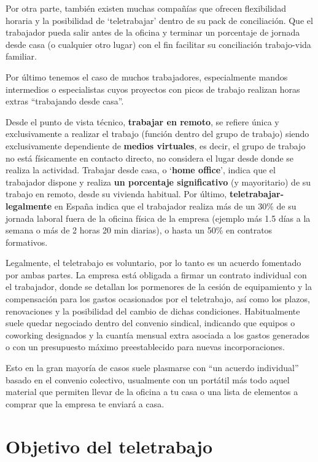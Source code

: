 Por otra parte, también existen muchas compañías que ofrecen flexibilidad horaria y la posibilidad de ‘teletrabajar’ dentro de su pack de conciliación. Que el trabajador pueda salir antes de la oficina y terminar un porcentaje de jornada desde casa (o cualquier otro lugar) con el fin facilitar su conciliación trabajo-vida familiar.

 Por último tenemos el caso de muchos trabajadores, especialmente mandos intermedios o especialistas cuyos proyectos con picos de trabajo realizan horas extras “trabajando desde casa”.

Desde el punto de vista técnico, \textbf{trabajar en remoto}, se refiere única y exclusivamente a realizar el trabajo (función dentro del grupo de trabajo) siendo exclusivamente dependiente de \textbf{medios virtuales}, es decir, el grupo de trabajo no está físicamente en contacto directo, no considera el lugar desde donde se realiza la actividad. Trabajar desde casa, o ‘\textbf{home office}’, indica que el trabajador dispone y realiza \textbf{un porcentaje significativo} (y mayoritario) de su trabajo en remoto, desde su vivienda habitual. Por último, \textbf{teletrabajar-legalmente} en España indica que el trabajador realiza más de un 30\% de su jornada laboral fuera de la oficina física de la empresa (ejemplo más 1.5 días a la semana o más de 2 horas 20 min diarias), o hasta un 50\% en contratos formativos.

Legalmente, el teletrabajo es voluntario, por lo tanto es un acuerdo fomentado por ambas partes. La empresa está obligada \cite{c_boe_teletrabajo} a firmar un contrato individual con el trabajador, donde se detallan los pormenores de la cesión de equipamiento y la compensación para los gastos ocasionados por el teletrabajo, así como los plazos, renovaciones y la posibilidad del cambio de dichas condiciones. Habitualmente suele quedar negociado dentro del convenio sindical, indicando que equipos o coworking designados y la cuantía mensual extra asociada a los gastos generados o con un presupuesto máximo preestablecido para nuevas incorporaciones. 

Esto en la gran  mayoría de casos suele plasmarse con “un acuerdo individual” basado en el convenio colectivo, usualmente con un portátil más todo aquel material que permiten llevar de la oficina a tu casa o una lista de elementos a comprar que la empresa te enviará a casa.


\section{Objetivo del teletrabajo}

